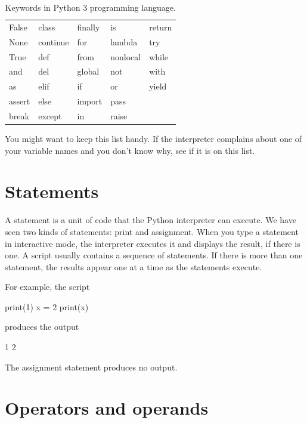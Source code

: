 \begin{table}[htb]
\begin{center}
\begin{tabular}{p{2cm} p{2cm} p{2cm} p{2cm} p{2cm}}
False & class & finally & is & return\\
None & continue & for & lambda & try\\
True & def & from & nonlocal & while\\
and & del & global & not & with\\
as & elif & if & or & yield\\
assert & else & import & pass & \\
break & except & in & raise & \\
\end{tabular}
\caption{Keywords in Python 3 programming language.}
\label{tab:python_keywords} 
\end{center}
\end{table}
%
You might want to keep this list handy.  If the interpreter complains
about one of your variable names and you don't know why, see if it
is on this list.


\section{Statements}

A statement is a unit of code that the Python interpreter can
execute.  We have seen two kinds of statements: print
and assignment.
%
%
When you type a statement in interactive mode, the interpreter
executes it and displays the result, if there is one.
%
A script usually contains a sequence of statements.  If there
is more than one statement, the results appear one at a time
as the statements execute.

For example, the script

\beforeverb
\begin{pycode}
print(1)
x = 2
print(x)
\end{pycode}
\afterverb
%
produces the output

\beforeverb
\begin{pyoutput}
1
2
\end{pyoutput}
\afterverb
%
The assignment statement produces no output.


\section{Operators and operands}

